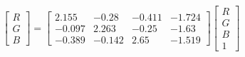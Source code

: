 \begin{equation}
\begin{bmatrix}
  R \\ G \\ B 
\end{bmatrix}=
\left[\begin{matrix}2.155 & -0.28 & -0.411 & -1.724\\ 
-0.097 & 2.263 & -0.25 & -1.63\\ 
-0.389 & -0.142 & 2.65 & -1.519\end{matrix}\right]
\begin{bmatrix}
  R \\ G \\ B \\ 1 
\end{bmatrix}
\end{equation}
